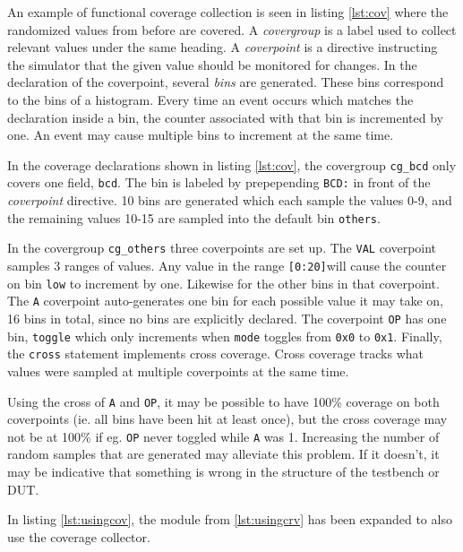 \documentclass[conference]{IEEEtran}
\newcommand{\longlist}[3]{{}}
\begin{document}
An example of functional coverage collection is seen in listing \ref{lst:cov} where the randomized values from before are covered. A \textit{covergroup} is a label used to collect relevant values under the same heading. A \textit{coverpoint} is a directive instructing the simulator that the given value should be monitored for changes. In the declaration of the coverpoint, several \textit{bins} are generated. These bins correspond to the bins of a histogram. Every time an event occurs which matches the declaration inside a bin, the counter associated with that bin is incremented by one. An event may cause multiple bins to increment at the same time.



In the coverage declarations shown in listing \ref{lst:cov}, the covergroup \texttt{cg\_bcd} only covers one field, \texttt{bcd}. The bin is labeled by prepepending \texttt{BCD:} in front of the \textit{coverpoint} directive. 10 bins are generated which each sample the values 0-9, and the remaining values 10-15 are sampled into the default bin \texttt{others}. 

In the covergroup \texttt{cg\_others} three coverpoints are set up. The \texttt{VAL} coverpoint samples 3 ranges of values. Any value in the range \texttt{[0:20]}will cause the counter on bin \texttt{low} to increment by one. Likewise for the other bins in that coverpoint. The \texttt{A} coverpoint auto-generates one bin for each possible value it may take on, 16 bins in total, since no bins are explicitly declared. The coverpoint \texttt{OP} has one bin, \texttt{toggle} which only increments when \texttt{mode} toggles from \texttt{0x0} to \texttt{0x1}. Finally, the \texttt{cross} statement implements cross coverage. Cross coverage tracks what values were sampled at multiple coverpoints at the same time.

Using the cross of \texttt{A} and \texttt{OP}, it may be possible to have 100\% coverage on both coverpoints (ie. all bins have been hit at least once), but the cross coverage may not be at 100\% if eg. \texttt{OP} never toggled while \texttt{A} was 1. Increasing the number of random samples that are generated may alleviate this problem. If it doesn't, it may be indicative that something is wrong in the structure of the testbench or DUT.

In listing \ref{lst:usingcov}, the module from \cref{lst:usingcrv} has been expanded to also use the coverage collector.

\longlist{snippets/top.sv}{Showcasing how multiple random values are generated and sampled by the coverage collector.}{lst:usingcov}
\end{document}
